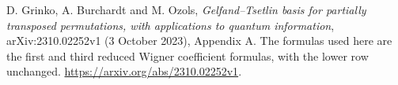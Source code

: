 D. Grinko, A. Burchardt and M. Ozols,
\emph{Gelfand--Tsetlin basis for partially transposed permutations,
with applications to quantum information},
arXiv:2310.02252v1 (3 October 2023), Appendix A.
The formulas used here are the first and third reduced Wigner
coefficient formulas, with the lower row unchanged.
\url{https://arxiv.org/abs/2310.02252v1}.
